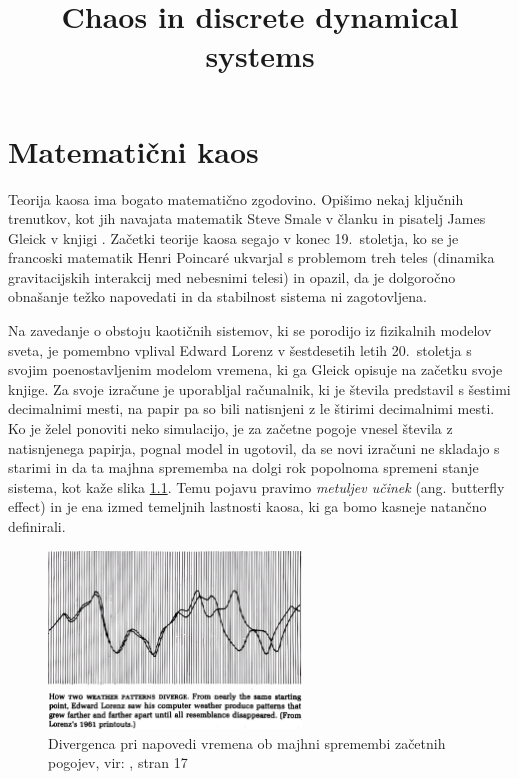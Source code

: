 \documentclass{isrmdelo}
\title{Chaos in discrete dynamical systems}
\begin{document}
\chapter{Matematični kaos}

Teorija kaosa ima bogato matematično zgodovino. Opišimo nekaj ključnih trenutkov, kot jih navajata matematik Steve Smale v članku \cite{smale98} in pisatelj James Gleick v knjigi \cite{gleick}. Začetki teorije kaosa segajo v konec 19.\ stoletja, ko se je francoski matematik Henri Poincaré ukvarjal s problemom treh teles (dinamika gravitacijskih interakcij med nebesnimi telesi) in opazil, da je dolgoročno obnašanje težko napovedati in da stabilnost sistema ni zagotovljena.

Na zavedanje o obstoju kaotičnih sistemov, ki se porodijo iz fizikalnih modelov sveta, je pomembno vplival Edward Lorenz v šestdesetih letih 20.\ stoletja s svojim poenostavljenim modelom vremena, ki ga Gleick opisuje na začetku svoje knjige. Za svoje izračune je uporabljal računalnik, ki je števila predstavil s šestimi decimalnimi mesti, na papir pa so bili natisnjeni z le štirimi decimalnimi mesti. Ko je želel ponoviti neko simulacijo, je za začetne pogoje vnesel števila z natisnjenega papirja, pognal model in ugotovil, da se novi izračuni ne skladajo s starimi in da ta majhna sprememba na dolgi rok popolnoma spremeni stanje sistema, kot kaže slika \ref{fig:lorenz}. Temu pojavu pravimo \emph{metuljev učinek} (ang. butterfly effect) in je ena izmed temeljnih lastnosti kaosa, ki ga bomo kasneje natančno definirali.

\begin{figure}[h!]
\begin{center}
\includegraphics[width=0.6\textwidth]{img/lorenz_vreme.jpg}
\end{center}
\caption{Divergenca pri napovedi vremena ob majhni spremembi začetnih pogojev, vir: \cite{gleick}, stran 17}
\label{fig:lorenz}
\end{figure}
\end{document}
